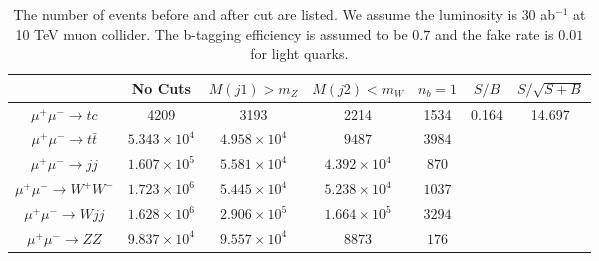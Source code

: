 \documentclass[a4paper,11pt]{article}
\begin{document}
\begin{center}
\begin{table}
  \begin{center}
  \begin{tabular}{c|c|c|c|c|c|c}
  \hline
  &  No Cuts   &    $M(j1)>m_Z$   &  $M(j2)<m_W$  & $n_b=1$ &  $S/B$  &    $S/\sqrt{S+B}$   \\
  \hline
  $\mu^+\mu^-\to tc$     &   4209     &     3193  &     2214  &  1534  &  \multirow{6}{*}{0.164} & \multirow{6}{*}{14.697} \\
  $\mu^+\mu^-\to t\bar{t}$     &   $5.343\times{10^4}$      &     $4.958\times{10^4}$  &  $9487$ & $3984$  & & \\
  $\mu^+\mu^-\to jj$     &   $1.607\times{10^5}$      &    $5.581\times{10^4}$    &  $4.392\times{10^4}$ & $870$ &   &  \\
  $\mu^+\mu^-\to W^+W^-$  & $1.723\times{10^6}$   & $5.445\times{10^4}$ &  $5.238\times{10^4}$ & $1037$ & & \\
  $\mu^+\mu^-\to Wjj$  & $1.628\times{10^6}$   &  $2.906\times{10^5}$   &  $1.664\times{10^5}$ & $3294$  & & \\
  $\mu^+\mu^-\to ZZ$  & $9.837\times{10^4}$  &  $9.557\times{10^4}$   &  $8873$ & $176$  &  & \\
  \hline
  \end{tabular}
  \end{center}
  \caption{The number of events before and after cut are listed. We assume the luminosity is $30$ ab$^{-1}$ at 10 TeV muon collider.  The b-tagging efficiency is assumed to be $0.7$ and the fake rate is $0.01$ for light quarks.\label{table:tc:cut}}
\end{table}
\end{center}
\end{document}

